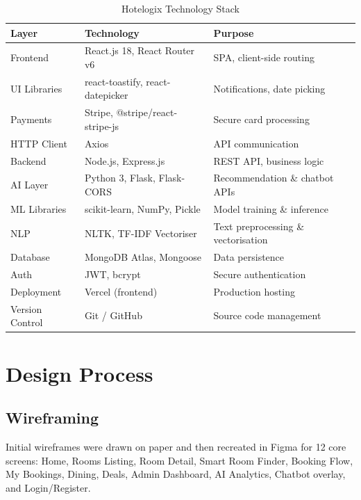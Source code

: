 \documentclass[12pt,a4paper]{report}
\begin{document}
\begin{table}[H]
\centering
\begin{tabularx}{\textwidth}{l l X}
\toprule
\textbf{Layer} & \textbf{Technology} & \textbf{Purpose} \\
\midrule
Frontend        & React.js 18, React Router v6          & SPA, client-side routing         \\
UI Libraries    & react-toastify, react-datepicker      & Notifications, date picking       \\
Payments        & Stripe, @stripe/react-stripe-js       & Secure card processing            \\
HTTP Client     & Axios                                 & API communication                 \\
Backend         & Node.js, Express.js                   & REST API, business logic          \\
AI Layer        & Python 3, Flask, Flask-CORS           & Recommendation \& chatbot APIs    \\
ML Libraries    & scikit-learn, NumPy, Pickle           & Model training \& inference       \\
NLP             & NLTK, TF-IDF Vectoriser               & Text preprocessing \& vectorisation \\
Database        & MongoDB Atlas, Mongoose               & Data persistence                  \\
Auth            & JWT, bcrypt                           & Secure authentication             \\
Deployment      & Vercel (frontend)                     & Production hosting                \\
Version Control & Git / GitHub                          & Source code management            \\
\bottomrule
\end{tabularx}
\caption{Hotelogix Technology Stack}
\end{table}

\section{Design Process}

\subsection*{Wireframing}
Initial wireframes were drawn on paper and then recreated in Figma for 12 core screens: Home, Rooms Listing, Room Detail, Smart Room Finder, Booking Flow, My Bookings, Dining, Deals, Admin Dashboard, AI Analytics, Chatbot overlay, and Login/Register.
\end{document}
